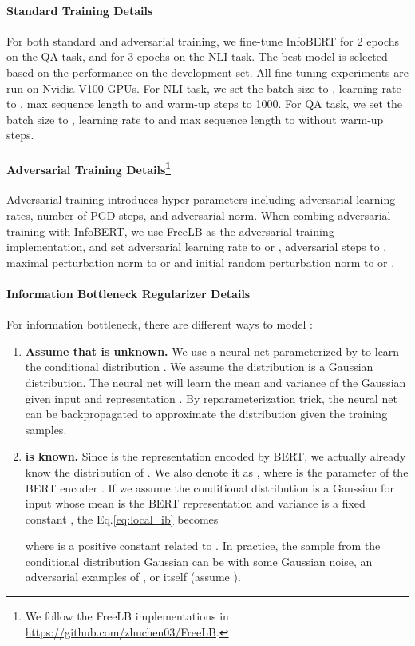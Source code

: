 \documentclass{article} \usepackage{iclr2021_conference,times}
\theoremstyle{definition}
\theoremstyle{remark}
\newcommand{\method}{InfoBERT\xspace}
\begin{document}
\paragraph{Standard Training Details} For both standard and adversarial training, we fine-tune \method for 2 epochs on the QA task, and for 3 epochs on the NLI task. The best model is selected based on the performance on the development set. All fine-tuning experiments are run on Nvidia V100 GPUs. For NLI task, we set the batch size to , learning rate to , max sequence length to  and warm-up steps to 1000. For QA task,  we set the batch size to , learning rate to  and max sequence length to  without warm-up steps. 

\paragraph[Adversarial Training Details]{Adversarial Training Details\footnote{We follow the FreeLB implementations in \url{https://github.com/zhuchen03/FreeLB}.}} Adversarial training introduces hyper-parameters including adversarial learning rates, number of PGD steps, and adversarial norm. When combing adversarial training with \method, we use FreeLB as the adversarial training implementation, and set adversarial learning rate to  or , adversarial steps to , maximal perturbation norm to  or  and initial random perturbation norm to  or .

\paragraph{Information Bottleneck Regularizer Details} For information bottleneck, there are different ways to model : 
\begin{enumerate}[leftmargin=*]
    \item \textbf{Assume that  is unknown.} We use a neural net parameterized by  to learn the conditional distribution . We assume the distribution is a Gaussian distribution. The neural net  will learn the mean and variance of the Gaussian given input  and representation . By reparameterization trick, the neural net can be backpropagated to approximate the distribution given the training samples.
    \item \textbf{ is known.} Since  is the representation encoded by BERT, we actually already know the distribution of . We also denote it as , where  is the parameter of the BERT encoder . If we assume the conditional distribution is a Gaussian  for input  whose mean is the BERT representation  and variance is a fixed constant , the Eq.\ref{eq:local_ib} becomes

    where  is a positive constant related to . In practice, the sample  from the conditional distribution Gaussian   can be  with some Gaussian noise, an adversarial examples of , or  itself (assume ).
\end{enumerate}
\end{document}
